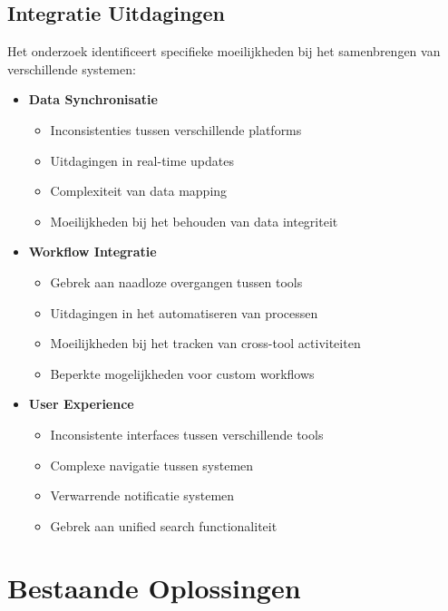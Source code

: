 \subsection{Integratie Uitdagingen}
\label{subsec:integratie}

Het \textcite{StackOverflow2023} onderzoek identificeert specifieke moeilijkheden bij het samenbrengen van verschillende systemen:

\begin{itemize}
    \item \textbf{Data Synchronisatie}
    \begin{itemize}
        \item Inconsistenties tussen verschillende platforms
        \item Uitdagingen in real-time updates
        \item Complexiteit van data mapping
        \item Moeilijkheden bij het behouden van data integriteit
    \end{itemize}
    
    \item \textbf{Workflow Integratie}
    \begin{itemize}
        \item Gebrek aan naadloze overgangen tussen tools
        \item Uitdagingen in het automatiseren van processen
        \item Moeilijkheden bij het tracken van cross-tool activiteiten
        \item Beperkte mogelijkheden voor custom workflows
    \end{itemize}
    
    \item \textbf{User Experience}
    \begin{itemize}
        \item Inconsistente interfaces tussen verschillende tools
        \item Complexe navigatie tussen systemen
        \item Verwarrende notificatie systemen
        \item Gebrek aan unified search functionaliteit
    \end{itemize}
\end{itemize}

\section{Bestaande Oplossingen}
\label{sec:bestaande-oplossingen}

